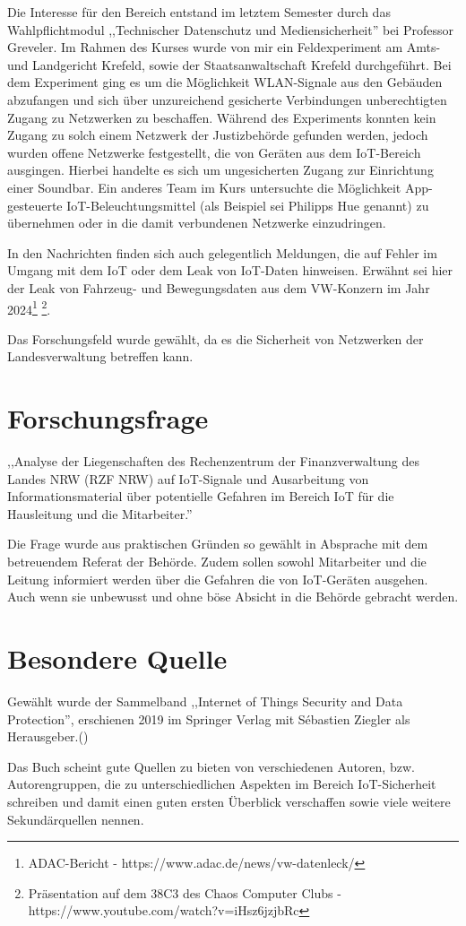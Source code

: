 \documentclass[12pt, a4paper, onecolumn, oneside, toc=bibliographynumbered, liststotoc]{scrartcl} %
\begin{document}
Die Interesse für den Bereich entstand im letztem Semester durch das Wahlpflichtmodul ,,Technischer Datenschutz und Mediensicherheit'' bei Professor Greveler. Im Rahmen des Kurses wurde von mir ein Feldexperiment am Amts- und Landgericht Krefeld, sowie der Staatsanwaltschaft Krefeld durchgeführt. Bei dem Experiment ging es um die Möglichkeit WLAN-Signale aus den Gebäuden abzufangen und sich über unzureichend gesicherte Verbindungen unberechtigten Zugang zu Netzwerken zu beschaffen. Während des Experiments konnten kein Zugang zu solch einem Netzwerk der Justizbehörde gefunden werden, jedoch wurden offene Netzwerke festgestellt, die von Geräten aus dem IoT-Bereich ausgingen. Hierbei handelte es sich um ungesicherten Zugang zur Einrichtung einer Soundbar. Ein anderes Team im Kurs untersuchte die Möglichkeit App-gesteuerte IoT-Beleuchtungsmittel (als Beispiel sei Philipps Hue genannt) zu übernehmen oder in die damit verbundenen Netzwerke einzudringen.

In den Nachrichten finden sich auch gelegentlich Meldungen, die auf Fehler im Umgang mit dem IoT oder dem Leak von IoT-Daten hinweisen. Erwähnt sei hier der Leak von Fahrzeug- und Bewegungsdaten aus dem VW-Konzern im Jahr 2024\footnote{ADAC-Bericht - https://www.adac.de/news/vw-datenleck/} \footnote{Präsentation auf dem 38C3 des Chaos Computer Clubs - https://www.youtube.com/watch?v=iHsz6jzjbRc}.

Das Forschungsfeld wurde gewählt, da es die Sicherheit von Netzwerken der Landesverwaltung betreffen kann.

\newpage
	\section{Forschungsfrage}
,,Analyse der Liegenschaften des Rechenzentrum der Finanzverwaltung des Landes NRW (RZF NRW) auf IoT-Signale und Ausarbeitung von Informationsmaterial über potentielle Gefahren im Bereich IoT für die Hausleitung und die Mitarbeiter.''

Die Frage wurde aus praktischen Gründen so gewählt in Absprache mit dem betreuendem Referat der Behörde. Zudem sollen sowohl Mitarbeiter und die Leitung informiert werden über die Gefahren die von IoT-Geräten ausgehen. Auch wenn sie unbewusst und ohne böse Absicht in die Behörde gebracht werden.

	\section{Besondere Quelle}
Gewählt wurde der Sammelband ,,Internet of Things Security and Data Protection'', erschienen 2019 im Springer Verlag mit Sébastien Ziegler als Herausgeber.(\cite{Ziegler.2019})

Das Buch scheint gute Quellen zu bieten von verschiedenen Autoren, bzw. Autorengruppen, die zu unterschiedlichen Aspekten im Bereich IoT-Sicherheit schreiben und damit einen guten ersten Überblick verschaffen sowie viele weitere Sekundärquellen nennen.


\nocite{*}
\printbibliography %
\end{document}
